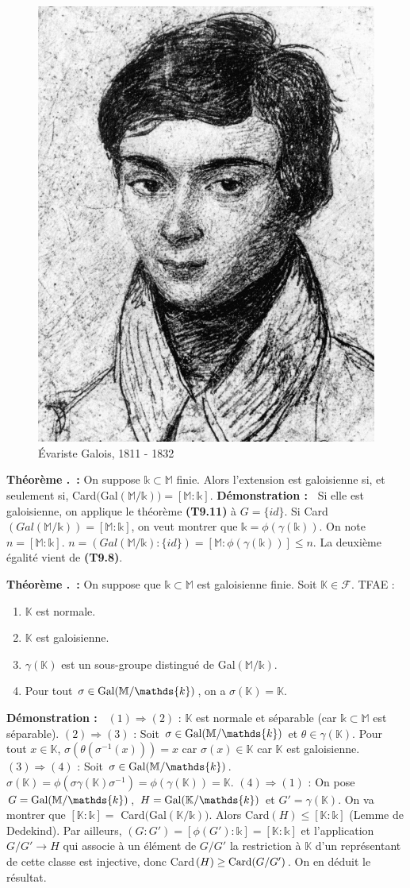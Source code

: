 \documentclass[5pt,a4paper]{article}
\newcounter{thm}[section]
\renewcommand{\thethm}{\thesection.\arabic{thm}}
\newcommand{\thm}[1]{\stepcounter{thm}\noindent\textbf{Théorème \thethm ~:} #1 \newline}
\newcommand{\thmEnum}[1]{\stepcounter{thm}\noindent\textbf{Théorème \thethm ~:} #1}
\newcommand{\demo}[1]{\textbf{Démonstration :~} #1 \newline}
\begin{document}
\begin{onehalfspacing}
\begin{figure}[!h]
\centering
\includegraphics[width = 0.33\linewidth]{ressources/galois.jpg}
\caption{Évariste Galois, 1811 - 1832}
\end{figure}


\thm{On suppose $\mathds{k} \subset \mathbb{M}$ finie. Alors l'extension est galoisienne si, et seulement si, Card$($Gal$(\mathbb{M}/\mathds{k})) = [\mathbb{M} : \mathds{k}]$.}
\demo{Si elle est galoisienne, on applique le théorème \textbf{(T9.11)} à $G = \{id\}$. Si Card$(Gal(\mathbb{M}/\mathds{k})) = [\mathbb{M} : \mathds{k}]$, on veut montrer que $\mathds{k} = \phi(\gamma(\mathds{k}))$. On note $n = [\mathbb{M} : \mathds{k}]$. $ n = (Gal(\mathbb{M}/\mathds{k}) : \{id\}) = [\mathbb{M} : \phi(\gamma(\mathds{k}))] \leq n$. La deuxième égalité vient de \textbf{(T9.8)}.}


\thmEnum{On suppose que $\mathds{k} \subset \mathbb{M}$ est galoisienne finie. Soit $\mathbb{K} \in \mathcal{F}$. TFAE :
	\begin{enumerate}
	\item $\mathbb{K}$ est normale.
	\item $\mathbb{K}$ est galoisienne.
	\item $\gamma(\mathbb{K})$ est un sous-groupe distingué de Gal$(\mathbb{M}/\mathds{k})$.
	\item Pour tout $\sigma \in \textup{Gal}(\mathbb{M}/\mathds{k})$, on a $\sigma(\mathbb{K}) = \mathbb{K}$.
	\end{enumerate}
}
\demo{$(1) \Rightarrow (2)$ : $\mathbb{K}$ est normale et séparable (car $\mathds{k} \subset \mathbb{M}$ est séparable). $(2) \Rightarrow (3)$ : Soit $\sigma \in \textup{Gal}(\mathbb{M}/\mathds{k})$ et $\theta \in \gamma(\mathbb{K})$. Pour tout $x \in \mathbb{K}$, $\sigma(\theta(\sigma^{-1}(x))) = x$ car $\sigma(x) \in \mathbb{K}$ car $\mathbb{K}$ est galoisienne. $(3) \Rightarrow (4)$ : Soit $\sigma \in \textup{Gal}(\mathbb{M}/\mathds{k})$. $\sigma(\mathbb{K}) = \phi(\sigma\gamma(\mathbb{K})\sigma^{-1}) = \phi(\gamma(\mathbb{K})) = \mathbb{K}$. $(4) \Rightarrow (1)$ : On pose $G = \textup{Gal}(\mathbb{M}/\mathds{k})$, $H = \textup{Gal}(\mathbb{K}/\mathds{k})$ et $G' = \gamma(\mathbb{K})$. On va montrer que $[\mathbb{K} : \mathds{k}] =$ Card$($Gal$(\mathbb{K}/\mathds{k}))$. Alors Card$(H) \leq [\mathbb{K} : \mathds{k}]$ (Lemme de Dedekind). Par ailleurs, $(G : G') = [\phi(G') : \mathds{k}] = [\mathbb{K} : \mathds{k}]$ et l'application $G/G' \rightarrow H$ qui associe à un élément de $G/G'$ la restriction à $\mathbb{K}$ d'un représentant de cette classe est injective, donc Card$(H) \geq \textup{Card}(G/G')$. On en déduit le résultat.}



\end{onehalfspacing}
\end{document}
